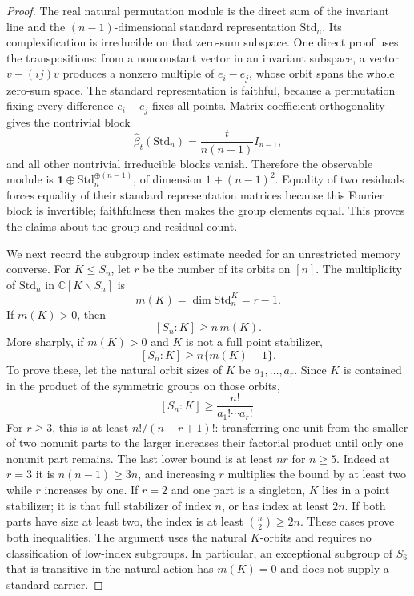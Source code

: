 \begin{proof}
The real natural permutation module is the direct sum of the
invariant line and the $(n-1)$-dimensional standard representation
$\mathrm{Std}_n$. Its complexification is irreducible on that
zero-sum subspace. One direct proof uses the transpositions: from
a nonconstant vector in an invariant subspace, a vector
$v-(ij)v$ produces a nonzero multiple of $e_i-e_j$, whose orbit
spans the whole zero-sum space. The standard representation is
faithful, because a permutation fixing every difference $e_i-e_j$
fixes all points. Matrix-coefficient orthogonality gives the
nontrivial block
\[
 \widehat\beta_t(\mathrm{Std}_n)
   =\frac{t}{n(n-1)}I_{n-1},
\]
and all other nontrivial irreducible blocks vanish. Therefore the
observable module is
$\boldsymbol1\oplus\mathrm{Std}_n^{\oplus(n-1)}$, of dimension
$1+(n-1)^2$. Equality of two residuals forces equality of their
standard representation matrices because this Fourier block is
invertible; faithfulness then makes the group elements equal.
This proves the claims about the group and residual count.

We next record the subgroup index estimate needed for an unrestricted
memory converse. For $K\le S_n$, let $r$ be the number of its orbits
on $[n]$. The multiplicity of $\mathrm{Std}_n$ in
$\mathbb C[K\backslash S_n]$ is
\[
 m(K)=\dim\mathrm{Std}_n^K=r-1.
\]
If $m(K)>0$, then
\begin{equation}\label{eq:r75-index-estimate}
 [S_n:K]\ge n\,m(K).
\end{equation}
More sharply, if $m(K)>0$ and $K$ is not a full point stabilizer,
\begin{equation}\label{eq:r75-index-extra}
 [S_n:K]\ge n\{m(K)+1\}.
\end{equation}
To prove these, let the natural orbit sizes of $K$ be
$a_1,\ldots,a_r$. Since $K$ is contained in the product of the
symmetric groups on those orbits,
\[
 [S_n:K]\ge\frac{n!}{a_1!\cdots a_r!}.
\]
For $r\ge3$, this is at least $n!/(n-r+1)!$: transferring one
unit from the smaller of two nonunit parts to the larger increases
their factorial product until only one nonunit part remains. The
last lower bound is at least $nr$ for $n\ge5$. Indeed at $r=3$
it is $n(n-1)\ge3n$, and increasing $r$ multiplies the bound by
at least two while $r$ increases by one. If $r=2$ and one part
is a singleton, $K$ lies in a point stabilizer; it is that full
stabilizer of index $n$, or has index at least $2n$. If both
parts have size at least two, the index is at least
$\binom n2\ge2n$. These cases prove both inequalities.
The argument uses the natural $K$-orbits and requires no classification
of low-index subgroups. In particular, an exceptional subgroup of
$S_6$ that is transitive in the natural action has $m(K)=0$ and
does not supply a standard carrier.


\end{proof}
